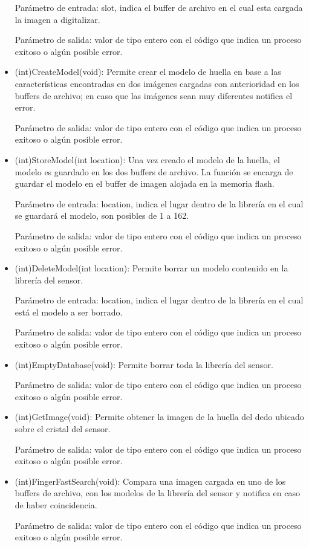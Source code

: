 \begin{itemize}
Parámetro de entrada: slot, indica el buffer de archivo en el cual esta cargada la imagen a digitalizar.

Parámetro de salida: valor de tipo entero con el código que indica un proceso exitoso o algún posible error.

\item (int)CreateModel(void): Permite crear el modelo de huella en base a las características encontradas en dos imágenes cargadas con anterioridad en los buffers de archivo; en caso que las imágenes sean muy diferentes notifica el error.

Parámetro de salida: valor de tipo entero con el código que indica un proceso exitoso o algún posible error.

\item (int)StoreModel(int location): Una vez creado el modelo de la huella, el modelo es guardado en los dos buffers de archivo. La función se encarga de guardar el modelo en el buffer de imagen alojada en la memoria flash.

Parámetro de entrada: location, indica el lugar dentro de la librería en el cual se guardará el modelo, son posibles de 1 a 162.

Parámetro de salida: valor de tipo entero con el código que indica un proceso exitoso o algún posible error.

\item (int)DeleteModel(int location): Permite borrar un modelo contenido en la librería del sensor.

Parámetro de entrada: location, indica el lugar dentro de la librería en el cual está el modelo a ser borrado.

Parámetro de salida: valor de tipo entero con el código que indica un proceso exitoso o algún posible error.

\item (int)EmptyDatabase(void): Permite borrar toda la librería del sensor.

Parámetro de salida: valor de tipo entero con el código que indica un proceso exitoso o algún posible error.

\item (int)GetImage(void): Permite obtener la imagen de la huella del dedo ubicado sobre el cristal del sensor. 

Parámetro de salida: valor de tipo entero con el código que indica un proceso exitoso o algún posible error.

\item (int)FingerFastSearch(void): Compara una imagen cargada en uno de los buffers de archivo, con los modelos de la librería del sensor y notifica en caso de haber coincidencia. 

Parámetro de salida: valor de tipo entero con el código que indica un proceso exitoso o algún posible error.

\end{itemize}

